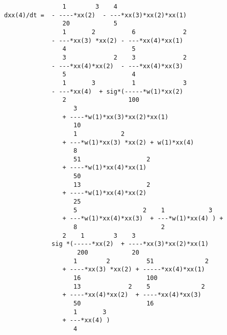 \documentclass[11pt,a5paper]{article}
\begin{document}
\begin{verbatim}
                1        3    4
dxx(4)/dt =  - ----*xx(2)  - ---*xx(3)*xx(2)*xx(1)
                20            5
                1       2          6             2
             - ---*xx(3) *xx(2) - ---*xx(4)*xx(1)
                4                  5
                3             2    3             2
             - ---*xx(4)*xx(2)  - ---*xx(4)*xx(3)
                5                  4
                1       3          1             3
             - ---*xx(4)  + sig*(-----*w(1)*xx(2)
                2                 100
                   3
                + ----*w(1)*xx(3)*xx(2)*xx(1)
                   10
                   1            2
                + ---*w(1)*xx(3) *xx(2) + w(1)*xx(4)
                   8
                   51                  2
                + ----*w(1)*xx(4)*xx(1)
                   50
                   13                  2
                + ----*w(1)*xx(4)*xx(2)
                   25
                   5                  2    1            3
                + ---*w(1)*xx(4)*xx(3)  + ---*w(1)*xx(4) ) +
                   8                       2
                2    1        3    3
             sig *(-----*xx(2)  + ----*xx(3)*xx(2)*xx(1)
                    200            20
                   1        2          51              2
                + ----*xx(3) *xx(2) + -----*xx(4)*xx(1)
                   16                  100
                   13             2    5              2
                + ----*xx(4)*xx(2)  + ----*xx(4)*xx(3)
                   50                  16
                   1       3
                + ---*xx(4) )
                   4
\end{verbatim}
\end{document}
